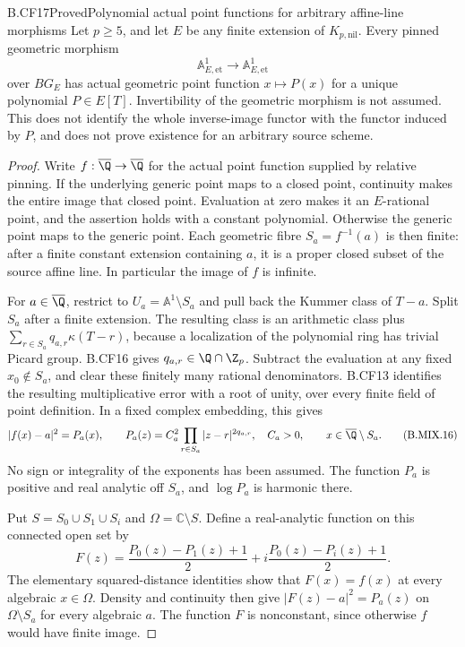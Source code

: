 \begin{claim}{B.CF17}{Proved}{Polynomial actual point functions for arbitrary affine-line morphisms}
Let \(p\geq5\), and let \(E\) be any finite extension
of \(K_{p,\mathrm{nil}}\). Every pinned geometric morphism
\[
       \mathbb A^1_{E,\mathrm{et}}
              \longrightarrow\mathbb A^1_{E,\mathrm{et}}
\]
over \(BG_E\) has actual geometric point function
\(x\mapsto P(x)\) for a unique polynomial \(P\in E[T]\).
Invertibility of the geometric morphism is not assumed.
This does not identify the whole inverse-image functor
with the functor induced by \(P\), and does not prove
existence for an arbitrary source scheme.
\end{claim}
\begin{proof}
Write \(f:\overline\Q\to\overline\Q\) for the actual
point function supplied by relative pinning. If the
underlying generic point maps to a closed point, continuity
makes the entire image that closed point. Evaluation at
zero makes it an \(E\)-rational point, and the assertion
holds with a constant polynomial. Otherwise the generic
point maps to the generic point. Each geometric fibre
\(S_a=f^{-1}(a)\) is then finite: after a finite constant
extension containing \(a\), it is a proper closed subset
of the source affine line. In particular the image of
\(f\) is infinite.

For \(a\in\overline\Q\), restrict to
\(U_a=\mathbb A^1\setminus S_a\) and pull back the
Kummer class of \(T-a\). Split \(S_a\) after a finite
extension. The resulting class is an arithmetic class
plus
\(\sum_{r\in S_a}q_{a,r}\kappa(T-r)\), because a
localization of the polynomial ring has trivial Picard
group. B.CF16 gives \(q_{a,r}\in\Q\cap\Z_p\).
Subtract the evaluation at any fixed \(x_0\notin S_a\),
and clear these finitely many rational denominators.
B.CF13 identifies the resulting multiplicative error
with a root of unity, over every finite field of
point definition. In a fixed complex embedding, this gives
\[
 |f(x)-a|^2=P_a(x),\qquad
 P_a(z)=C_a^2\prod_{r\in S_a}|z-r|^{2q_{a,r}},
 \quad C_a>0,
 \qquad x\in\overline\Q\setminus S_a.                   \tag{B.MIX.16}
\]
No sign or integrality of the exponents has been assumed.
The function \(P_a\) is positive and real analytic off
\(S_a\), and \(\log P_a\) is harmonic there.

Put \(S=S_0\cup S_1\cup S_i\) and
\(\Omega=\mathbb C\setminus S\). Define a real-analytic
function on this connected open set by
\[
 F(z)=\frac{P_0(z)-P_1(z)+1}{2}
          +i\frac{P_0(z)-P_i(z)+1}{2}.                  \tag{B.MIX.17}
\]
The elementary squared-distance identities show that
\(F(x)=f(x)\) at every algebraic \(x\in\Omega\).
Density and continuity then give
\(|F(z)-a|^2=P_a(z)\) on \(\Omega\setminus S_a\)
for every algebraic \(a\). The function \(F\) is
nonconstant, since otherwise \(f\) would have finite image.


\end{proof}
